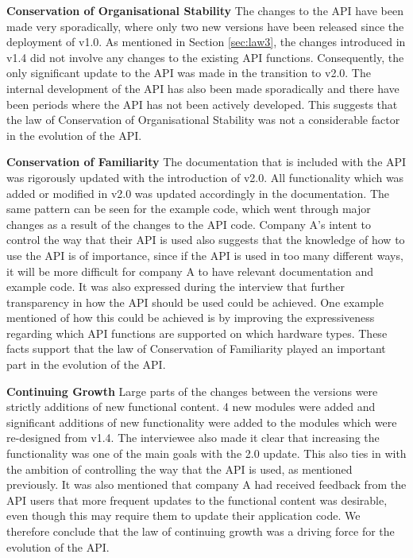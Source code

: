 \documentclass{sig-alternate}
\begin{document}
\smallskip \noindent
\textbf{Conservation of Organisational Stability  } 
The changes to the API have been made very sporadically, where only two new versions have been released since the deployment of v1.0. As mentioned in Section \ref{sec:law3}, the changes introduced in v1.4 did not involve any changes to the existing API functions. Consequently, the only significant update to the API was made in the transition to v2.0. The internal development of the API has also been made sporadically and there have been periods where the API has not been actively developed. This suggests that the law of Conservation of Organisational Stability was not a considerable factor in the evolution of the API. 

\smallskip \noindent
\textbf{Conservation of Familiarity  } 
The documentation that is included with the API was rigorously updated with the introduction of v2.0. All functionality which was added or modified in v2.0 was updated accordingly in the documentation. The same pattern can be seen for the example code, which went through major changes as a result of the changes to the API code. Company A's intent to control the way that their API is used also suggests that the knowledge of how to use the API is of importance, since if the API is used in too many different ways, it will be more difficult for company A to have relevant documentation and example code. It was also expressed during the interview that further transparency in how the API should be used could be achieved. One example mentioned of how this could be achieved is by improving the expressiveness regarding which API functions are supported on which hardware types. These facts support that the law of Conservation of Familiarity played an important part in the evolution of the API. 

\smallskip \noindent
\textbf{Continuing Growth  } 
Large parts of the changes between the versions were strictly additions of new functional content. 4 new modules were added and significant additions of new functionality were added to the modules which were re-designed from v1.4. The interviewee also made it clear that increasing the functionality was one of the main goals with the 2.0 update. This also ties in with the ambition of controlling the way that the API is used, as mentioned previously. It was also mentioned that company A had received feedback from the API users that more frequent updates to the functional content was desirable, even though this may require them to update their application code. We therefore conclude that the law of continuing growth was a driving force for the evolution of the API. 
\end{document}
